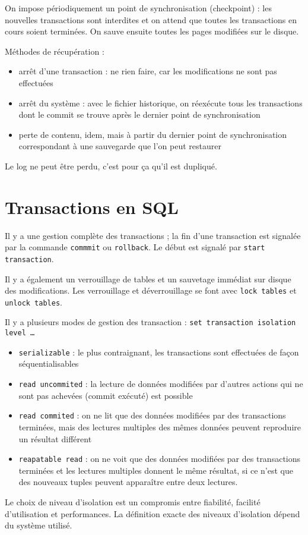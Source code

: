 		On impose périodiquement un point de synchronisation (checkpoint) : les nouvelles transactions sont interdites et on attend que toutes les transactions en cours soient terminées. On sauve ensuite toutes les pages modifiées sur le disque.
		
		Méthodes de récupération :
		
		\begin{itemize}
			\item arrêt d'une transaction : ne rien faire, car les modifications ne sont pas effectuées
			\item arrêt du système : avec le fichier historique, on réexécute tous les transactions dont le commit se trouve après le dernier point de synchronisation
			\item perte de contenu, idem, mais à partir du dernier point de synchronisation correspondant à une sauvegarde que l'on peut restaurer
		\end{itemize}
		
		Le log ne peut être perdu, c'est pour ça qu'il est dupliqué.
		
	\section{Transactions en SQL}
	
	Il y a une gestion complète des transactions ; la fin d'une transaction est signalée par la commande \texttt{commmit} ou \texttt{rollback}. Le début est signalé par \texttt{start transaction}.
	
	Il y a également un verrouillage de tables et un sauvetage immédiat sur disque des modifications. Les verrouillage et déverrouillage se font avec \texttt{lock tables} et \texttt{unlock tables}.
	
	Il y a plusieurs modes de gestion des transaction : \texttt{set transaction isolation level \dots}
	
	\begin{itemize}
		\item \texttt{serializable} : le plus contraignant, les transactions sont effectuées de façon séquentialisables
		\item \texttt{read uncommited} : la lecture de données modifiées par d'autres actions qui ne sont pas achevées (commit exécuté) est possible
		\item \texttt{read commited} : on ne lit que des données modifiées par des transactions terminées, mais des lectures multiples des mêmes données peuvent reproduire un résultat différent
		\item \texttt{reapatable read} : on ne voit que des données modifiées par des transactions terminées et les lectures multiples donnent le même résultat, si ce n'est que des nouveaux tuples peuvent apparaître entre deux lectures.
	\end{itemize}
	
	Le choix de niveau d'isolation est un compromis entre fiabilité, facilité d'utilisation et performances. La définition exacte des niveaux d'isolation dépend du système utilisé.